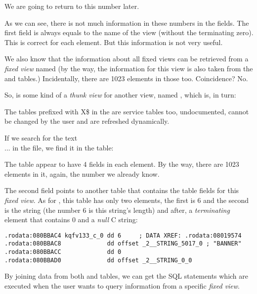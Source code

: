 We are going to return to this number later.

As we can see, there is not much information in these numbers in the fields. The first field is always equals to the name of the view (without the terminating zero).
This is correct for each element. But this information is not very useful.

We also know that the information about all fixed views can be retrieved from a \emph{fixed view} named 
(by the way, the information for this view is also taken from the  and  tables.)
Incidentally, there are 1023 elements in those too. Coincidence? No.



So,  is some kind of a \emph{thunk view} for another view, named , which is, in turn:



The tables prefixed with X\$ in the \oracle are service tables too, undocumented, cannot be changed by the user and are refreshed dynamically.

If we search for the text \\

...  in the  file, we find it in the  table:



The table appear to have 4 fields in each element. By the way, there are 1023 elements in it, again, the number we already know.

The second field points to another table that contains the table fields for this \emph{fixed view}.
As for , this table has only two elements, the first is 6 and the second is 
the  string (the number 6 is this string's length) and after, a \emph{terminating} element that contains 
0 and a \emph{null} C string:

\begin{lstlisting}[caption=kqf.o,style=customasmx86]
.rodata:080BBAC4 kqfv133_c_0 dd 6     ; DATA XREF: .rodata:08019574
.rodata:080BBAC8             dd offset _2__STRING_5017_0 ; "BANNER"
.rodata:080BBACC             dd 0
.rodata:080BBAD0             dd offset _2__STRING_0_0
\end{lstlisting}

By joining data from both  and  tables, we can get the SQL statements which are executed when the user wants to query information from a specific \emph{fixed view}.

